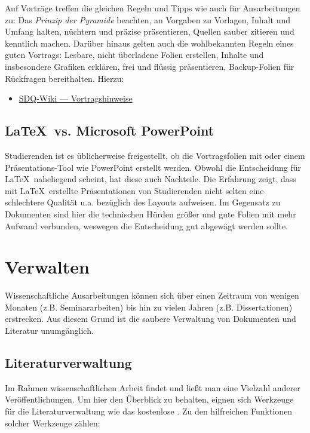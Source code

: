 Auf Vorträge treffen die gleichen Regeln und Tipps wie auch für Ausarbeitungen zu: Das \emph{Prinzip der Pyramide} beachten, an Vorgaben zu Vorlagen, Inhalt und Umfang halten, nüchtern und präzise präsentieren, Quellen sauber zitieren und kenntlich machen. 
Darüber hinaus gelten auch die wohlbekannten Regeln eines guten Vortrags: Lesbare, nicht überladene Folien erstellen, Inhalte und insbesondere Grafiken erklären, frei und flüssig präsentieren, Backup-Folien für Rückfragen bereithalten. Hierzu:

\smallskip
\begin{itemize}[label={\symbolInfo}]
    \item \href{https://sdqweb.ipd.kit.edu/wiki/Vortragshinweise}{SDQ-Wiki --- Vortragshinweise}
\end{itemize}

\subsection{\LaTeX\ vs. Microsoft PowerPoint}
\label{sec:Praesentieren:PowerPoint}

Studierenden ist es üblicherweise freigestellt, ob die Vortragsfolien mit  oder einem Präsentations-Tool wie PowerPoint erstellt werden. 
Obwohl die Entscheidung für \LaTeX\ naheliegend scheint, hat diese auch Nachteile. 
Die Erfahrung zeigt, dass mit \LaTeX\ erstellte Präsentationen von Studierenden nicht selten eine schlechtere Qualität u.a. bezüglich des Layouts aufweisen. 
Im Gegensatz zu Dokumenten sind hier die technischen Hürden größer und gute Folien mit mehr Aufwand verbunden, weswegen die Entscheidung gut abgewägt werden sollte.


\section{Verwalten}
\label{sec:Verwalten}

Wissenschaftliche Ausarbeitungen können sich über einen Zeitraum von wenigen Monaten (z.B. Seminararbeiten) bis hin zu vielen Jahren (z.B. Dissertationen) erstrecken. 
Aus diesem Grund ist die saubere Verwaltung von Dokumenten und Literatur unumgänglich.

\subsection{Literaturverwaltung}
\label{sec:Verwalten:Literatur}

Im Rahmen wissenschaftlichen Arbeit findet und ließt man eine Vielzahl anderer Veröffentlichungen. 
Um hier den Überblick zu behalten, eignen sich Werkzeuge für die Literaturverwaltung wie das kostenlose . 
Zu den hilfreichen Funktionen solcher Werkzeuge zählen:

